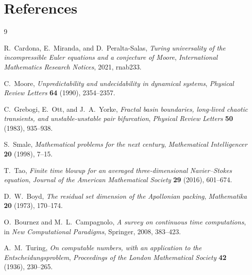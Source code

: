 \documentclass[11pt]{article}
\theoremstyle{plain}
\theoremstyle{definition}
\theoremstyle{remark}
\begin{document}
\section*{References}

\begin{thebibliography}{9}

R.~Cardona, E.~Miranda, and D.~Peralta-Salas,
\emph{Turing universality of the incompressible Euler equations and a
conjecture of Moore},
\textit{International Mathematics Research Notices}, 2021, rnab233.

C.~Moore,
\emph{Unpredictability and undecidability in dynamical systems},
\textit{Physical Review Letters} \textbf{64} (1990), 2354--2357.

C.~Grebogi, E.~Ott, and J.~A.~Yorke,
\emph{Fractal basin boundaries, long-lived chaotic transients, and
unstable-unstable pair bifurcation},
\textit{Physical Review Letters} \textbf{50} (1983), 935--938.

S.~Smale,
\emph{Mathematical problems for the next century},
\textit{Mathematical Intelligencer} \textbf{20} (1998), 7--15.

T.~Tao,
\emph{Finite time blowup for an averaged three-dimensional Navier--Stokes
equation},
\textit{Journal of the American Mathematical Society} \textbf{29} (2016),
601--674.

D.~W.~Boyd,
\emph{The residual set dimension of the Apollonian packing},
\textit{Mathematika} \textbf{20} (1973), 170--174.

O.~Bournez and M.~L.~Campagnolo,
\emph{A survey on continuous time computations},
in \textit{New Computational Paradigms}, Springer, 2008, 383--423.

A.~M.~Turing,
\emph{On computable numbers, with an application to the
Entscheidungsproblem},
\textit{Proceedings of the London Mathematical Society} \textbf{42} (1936),
230--265.

\end{thebibliography}
\end{document}
